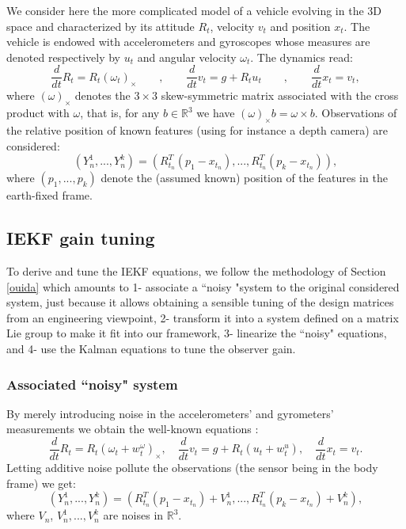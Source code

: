 \documentclass[a4paper,12pt,onecolumn]{article}
\newcommand{\RR}{{\mathbb{R}}}
\begin{document}
We consider here the  more complicated model of a vehicle evolving in the 3D space and characterized by its attitude $R_t$, velocity $v_t$ and position $x_t$. The vehicle is endowed with accelerometers and gyroscopes whose measures are denoted respectively by $u_t$ and angular velocity $\omega_t$. The   dynamics read:
\begin{equation}
\label{3D_dynamics:nonoise} 
\frac{d}{dt} R_t  = R_t (\omega_t)_\times \qquad , \qquad
\frac{d}{dt} v_t  = g + R_t u_t  \qquad , \qquad
\frac{d}{dt} x_t  = v_t ,
\end{equation}
where $(\omega)_\times$ denotes the $3\times 3$ skew-symmetric matrix associated with the cross product with $\omega$, that is, for any $b\in\RR^3$ we have $(\omega)_\times b=\omega\times b$. 
Observations of the relative position of known features (using for instance a depth camera) are considered:
\begin{equation}
(Y_n^1,...,Y_n^k) = \left( R_{t_n}^T (p_1-x_{t_n}) , ..., R_{t_n}^T (p_k-x_{t_n})   \right), \label{3D_features:nonoise}
\end{equation} where $(p_1,...,p_k)$ denote the (assumed known) position of the features in the earth-fixed frame.

\subsection{IEKF gain tuning}
To derive and tune the IEKF equations, we follow the methodology of Section \ref{ouida} which amounts to 1- associate a ``noisy "system to the original considered system, just because it allows obtaining a sensible  tuning of the design matrices from an engineering viewpoint, 2- transform it into a system defined on a matrix Lie group to make it fit into our framework, 3- linearize the ``noisy" equations, and 4- use the Kalman equations to tune the observer gain. 

\subsubsection{Associated ``noisy" system}

By merely introducing noise in the accelerometers' and gyrometers' measurements we obtain the well-known equations \cite{farrell2008aided}:
\begin{equation}
\label{3D_dynamics} 
\frac{d}{dt} R_t  = R_t (\omega_t+w_t^{\omega})_\times  , \quad
\frac{d}{dt} v_t  = g + R_t (u_t+w_t^u)   , \quad
\frac{d}{dt} x_t  = v_t .
\end{equation}
Letting additive noise pollute the observations (the sensor being in the body frame) we get:
\begin{equation}
(Y_n^1,...,Y_n^k) = \left( R_{t_n}^T (p_1-x_{t_n}) + V_n^1, ..., R_{t_n}^T (p_k-x_{t_n})  + V_n^k \right), \label{3D_features}
\end{equation}
where $V_n$, $V_n^1,...,V_n^k$ are noises in $\RR^3$.
\end{document}
